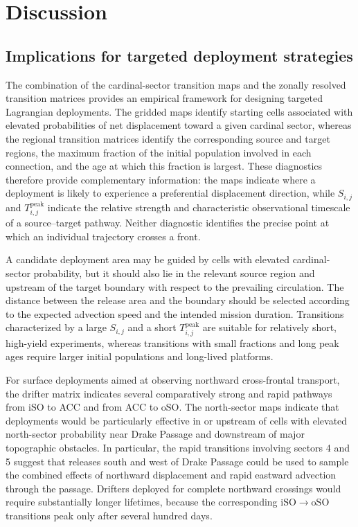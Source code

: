 \documentclass[
  draft
]{agujournal2025}
\begin{document}
\section{Discussion}
    \subsection{Implications for targeted deployment strategies}
        \label{sec:deployment_strategies}
        The combination of the cardinal-sector transition maps and the zonally resolved transition matrices provides an empirical framework for designing targeted Lagrangian deployments. The gridded maps identify starting cells associated with elevated probabilities of net displacement toward a given cardinal sector, whereas the regional transition matrices identify the corresponding source and target regions, the maximum fraction of the initial population involved in each connection, and the age at which this fraction is largest. These diagnostics therefore provide complementary information: the maps indicate where a deployment is likely to experience a preferential displacement direction, while $S_{i,j}$ and $T_{i,j}^{\mathrm{peak}}$ indicate the relative strength and characteristic observational timescale of a source--target pathway. Neither diagnostic identifies the precise point at which an individual trajectory crosses a front.
    
        A candidate deployment area may be guided by cells with elevated cardinal-sector probability, but it should also lie in the relevant source region and upstream of the target boundary with respect to the prevailing circulation. The distance between the release area and the boundary should be selected according to the expected advection speed and the intended mission duration. Transitions characterized by a large $S_{i,j}$ and a short $T_{i,j}^{\mathrm{peak}}$ are suitable for relatively short, high-yield experiments, whereas transitions with small fractions and long peak ages require larger initial populations and long-lived platforms.
        
        For surface deployments aimed at observing northward cross-frontal transport, the drifter matrix indicates several comparatively strong and rapid pathways from iSO to ACC and from ACC to oSO. The north-sector maps indicate that deployments would be particularly effective in or upstream of cells with elevated north-sector probability near Drake Passage and downstream of major topographic obstacles. In particular, the rapid transitions involving sectors 4 and 5 suggest that releases south and west of Drake Passage could be used to sample the combined effects of northward displacement and rapid eastward advection through the passage. Drifters deployed for complete northward crossings would require substantially longer lifetimes, because the corresponding $\mathrm{iSO}\rightarrow\mathrm{oSO}$ transitions peak only after several hundred days.
    
\end{document}
